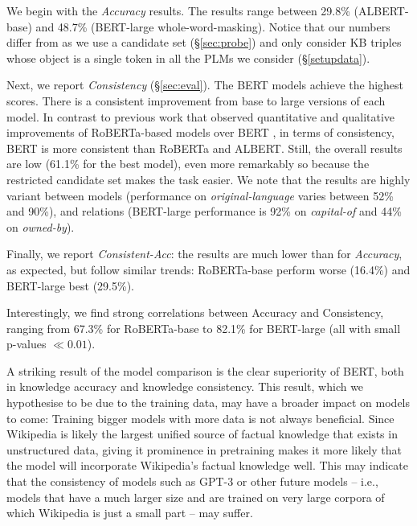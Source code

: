 We begin with the \textit{Accuracy} results. 
The results range between 29.8\% (ALBERT-base) and 48.7\% (BERT-large whole-word-masking).
Notice that our numbers differ from \citet{lama} as we use a
candidate set (\S\ref{sec:probe}) and only consider KB
triples whose object is a single token in all the PLMs we consider (\S\ref{setupdata}). 

Next, we report  \textit{Consistency}  (\S\ref{sec:eval}).
The BERT models achieve the highest scores. There is a consistent improvement from  {base} to {large} versions of each model.
In contrast to previous work that observed quantitative and qualitative improvements of RoBERTa-based models over BERT \cite{roberta,talmor2019olmpics}, in terms of consistency, BERT is more consistent than RoBERTa and ALBERT.
Still, the overall results are low (61.1\% for
the best model), %
even more remarkably so because the restricted candidate set
makes the task easier.
We note that the results are highly variant between models
 (performance on \textit{original-language} varies between
52\% and 90\%), and relations (BERT-large performance is
92\% on \textit{capital-of} and 44\% on \textit{owned-by}).

Finally, we report
\emph{Consistent-Acc}:
the results are much lower than for \textit{Accuracy}, as expected,
but follow similar trends: RoBERTa-base perform worse (16.4\%) and BERT-large  best  (29.5\%).

Interestingly, we find strong correlations between Accuracy
and Consistency, ranging from 67.3\% for RoBERTa-base to
82.1\% for BERT-large (all with small p-values $\ll 0.01 $).




A striking result of the model comparison is
the clear superiority of
BERT, both in knowledge accuracy and knowledge
consistency. This result, which we hypothesise to be due to
the training data, may have a broader impact on models to
come: Training bigger models with more data is not always
beneficial. Since Wikipedia is likely the largest unified source
of factual knowledge that exists in unstructured data,
giving it prominence in pretraining  makes it more
likely that the model will incorporate Wikipedia's factual knowledge
well.
This may indicate that the consistency of models such as GPT-3 \cite{gpt3}
or other future models -- i.e., models that
have a much larger size and
are trained on very large corpora of
which Wikipedia is just a small part -- may suffer.

